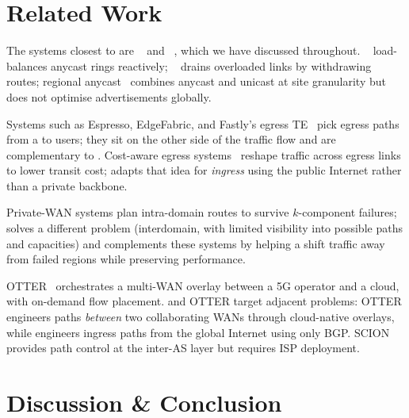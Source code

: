 \documentclass[acmsmall,anonymous,review,nonacm,10pt]{acmart}
\begin{document}
\section{Related Work}
\label{sec:related}

  The systems closest to
\sparse are \painter~\cite{painter} and \anyopt~\cite{anyopt},
which we have discussed throughout.  \fastroute~\cite{fastroute}
load-balances anycast rings reactively; \tipsy~\cite{tipsy} drains
overloaded links by withdrawing routes; regional
anycast~\cite{regional-anycast,jiangchen-cdn-imc,tom-anycast,calder2015analyzing,end-user-mapping,cartographer,whyhigh,footprint-microsoft}
combines anycast and unicast at site granularity but does not
optimise advertisements globally.

  Systems such as Espresso,
EdgeFabric, and Fastly's egress
TE~\cite{espresso,edge-fabric,fastly-egress} pick egress paths
from a \servprod to users; they sit on the other side of the
traffic flow and are complementary to \sparse.  Cost-aware egress
systems~\cite{entact,cascara,taiji} reshape traffic across egress
links to lower transit cost; \sparse adapts that idea for
\emph{ingress} using the public Internet rather than a private
backbone.

  Private-WAN systems
\cite{hose-benders-facebook,evolve-or-die,blast-shield,google-capa-nsdi,r3,ffc,lancet,pcf}
plan intra-domain routes to survive $k$-component failures;
\sparse solves a different problem (interdomain, with limited
visibility into possible paths and capacities) and complements
these systems by helping a \servprod shift traffic away from
failed regions while preserving performance.

  OTTER~\cite{otter-nsdi25}
orchestrates a multi-WAN overlay between a 5G operator and a
cloud, with on-demand flow placement.  \sparse and OTTER target
adjacent problems: OTTER engineers paths \emph{between} two
collaborating WANs through cloud-native overlays, while \sparse
engineers ingress paths from the global Internet using only BGP.
SCION~\cite{scion_deployment_conext} provides path control at the inter-AS layer
but requires ISP deployment.

\section{Discussion \& Conclusion}
\label{sec:discussion-conclusion}
\end{document}
